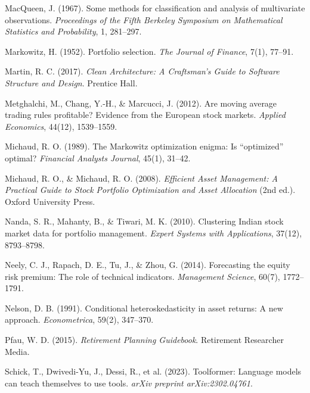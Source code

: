 \documentclass[12pt, a4paper, oneside]{report}
\begin{document}
\begin{enumerate}[label={[\arabic*]}, nosep, leftmargin=*, itemsep=4pt]
\item MacQueen, J. (1967). Some methods for classification and analysis of multivariate observations. \textit{Proceedings of the Fifth Berkeley Symposium on Mathematical Statistics and Probability}, 1, 281--297.

\item Markowitz, H. (1952). Portfolio selection. \textit{The Journal of Finance}, 7(1), 77--91.

\item Martin, R. C. (2017). \textit{Clean Architecture: A Craftsman's Guide to Software Structure and Design}. Prentice Hall.

\item Metghalchi, M., Chang, Y.-H., \& Marcucci, J. (2012). Are moving average trading rules profitable? Evidence from the European stock markets. \textit{Applied Economics}, 44(12), 1539--1559.

\item Michaud, R. O. (1989). The Markowitz optimization enigma: Is ``optimized'' optimal? \textit{Financial Analysts Journal}, 45(1), 31--42.

\item Michaud, R. O., \& Michaud, R. O. (2008). \textit{Efficient Asset Management: A Practical Guide to Stock Portfolio Optimization and Asset Allocation} (2nd ed.). Oxford University Press.

\item Nanda, S. R., Mahanty, B., \& Tiwari, M. K. (2010). Clustering Indian stock market data for portfolio management. \textit{Expert Systems with Applications}, 37(12), 8793--8798.

\item Neely, C. J., Rapach, D. E., Tu, J., \& Zhou, G. (2014). Forecasting the equity risk premium: The role of technical indicators. \textit{Management Science}, 60(7), 1772--1791.

\item Nelson, D. B. (1991). Conditional heteroskedasticity in asset returns: A new approach. \textit{Econometrica}, 59(2), 347--370.

\item Pfau, W. D. (2015). \textit{Retirement Planning Guidebook}. Retirement Researcher Media.

\item Schick, T., Dwivedi-Yu, J., Dessi, R., et al. (2023). Toolformer: Language models can teach themselves to use tools. \textit{arXiv preprint arXiv:2302.04761}.


\end{enumerate}
\end{document}
